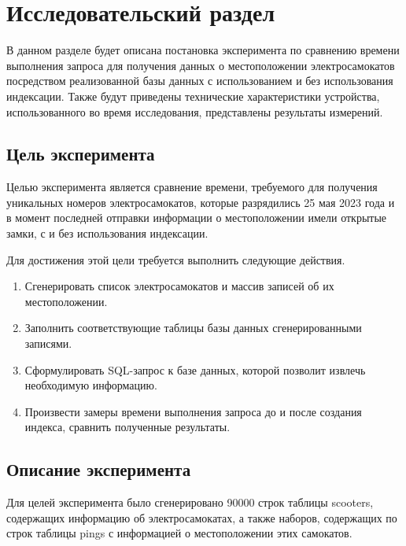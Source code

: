 \chapter{Исследовательский раздел}

В данном разделе будет описана постановка эксперимента по сравнению времени выполнения запроса для получения данных о местоположении электросамокатов посредством реализованной базы данных с использованием и без использования индексации. Также будут приведены технические характеристики устройства, использованного во время исследования, представлены результаты измерений.

\section{Цель эксперимента}

Целью эксперимента является сравнение времени, требуемого для получения уникальных номеров электросамокатов, которые разрядились 25 мая 2023 года и в момент последней отправки информации о местоположении имели открытые замки, с и без использования индексации.

Для достижения этой цели требуется выполнить следующие действия.

\begin{enumerate}
    \item Сгенерировать список электросамокатов и массив записей об их местоположении.
    \item Заполнить соответствующие таблицы базы данных сгенерированными записями.
    \item Сформулировать SQL-запрос к базе данных, которой позволит извлечь необходимую информацию.
    \item Произвести замеры времени выполнения запроса до и после создания индекса, сравнить полученные результаты.
\end{enumerate}

\section{Описание эксперимента}


Для целей эксперимента было сгенерировано \num[round-precision=0]{90000} строк таблицы scooters, содержащих информацию об электросамокатах, а также  наборов, содержащих по  строк таблицы pings с информацией о местоположении этих самокатов.

